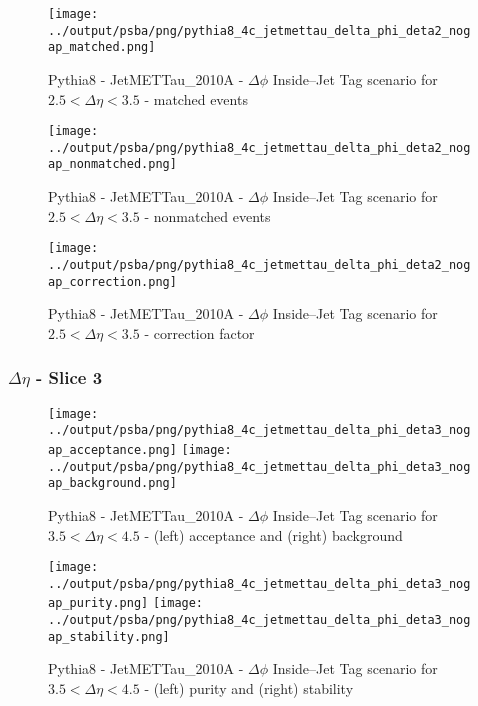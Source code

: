 \documentclass[11pt]{book}
\begin{document}
\begin{figure}[ht]
\centering
\texttt{[image: ../output/psba/png/pythia8\_4c\_jetmettau\_delta\_phi\_deta2\_nogap\_matched.png]}
\caption{Pythia8 - JetMETTau\_2010A - $\Delta\phi$ Inside--Jet Tag scenario for $2.5 < \Delta\eta < 3.5$ - matched events}
\label{fig:p8_jetmettau_delta_phi_deta2_nogap_matched}
\end{figure}

\begin{figure}[ht]
\centering
\texttt{[image: ../output/psba/png/pythia8\_4c\_jetmettau\_delta\_phi\_deta2\_nogap\_nonmatched.png]}
\caption{Pythia8 - JetMETTau\_2010A - $\Delta\phi$ Inside--Jet Tag scenario for $2.5 < \Delta\eta < 3.5$ - nonmatched events}
\label{fig:p8_jetmettau_delta_phi_deta2_nogap_nonmatched}
\end{figure}

\begin{figure}[ht]
\centering
\texttt{[image: ../output/psba/png/pythia8\_4c\_jetmettau\_delta\_phi\_deta2\_nogap\_correction.png]}
\caption{Pythia8 - JetMETTau\_2010A - $\Delta\phi$ Inside--Jet Tag scenario for $2.5 < \Delta\eta < 3.5$ - correction factor}
\label{fig:p8_jetmettau_delta_phi_deta2_nogap_correction}
\end{figure}


\clearpage
\subsubsection{$\Delta\eta$ - Slice 3}
\begin{figure}[ht]
\centering
\texttt{[image: ../output/psba/png/pythia8\_4c\_jetmettau\_delta\_phi\_deta3\_nogap\_acceptance.png]}
\texttt{[image: ../output/psba/png/pythia8\_4c\_jetmettau\_delta\_phi\_deta3\_nogap\_background.png]}
\caption{Pythia8 - JetMETTau\_2010A - $\Delta\phi$ Inside--Jet Tag scenario for $3.5 < \Delta\eta < 4.5$ - (left) acceptance and (right) background}
\label{fig:p8_jetmettau_delta_phi_deta3_nogap_ab}
\end{figure}

\begin{figure}[ht]
\centering
\texttt{[image: ../output/psba/png/pythia8\_4c\_jetmettau\_delta\_phi\_deta3\_nogap\_purity.png]}
\texttt{[image: ../output/psba/png/pythia8\_4c\_jetmettau\_delta\_phi\_deta3\_nogap\_stability.png]}
\caption{Pythia8 - JetMETTau\_2010A - $\Delta\phi$ Inside--Jet Tag scenario for $3.5 < \Delta\eta < 4.5$ - (left) purity and (right) stability}
\label{fig:p8_jetmettau_delta_phi_deta3_nogap_ps}
\end{figure}
\end{document}
